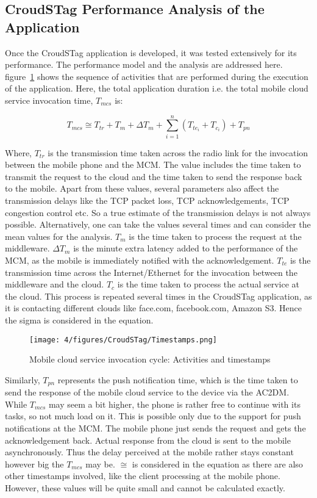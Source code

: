 \subsection{CroudSTag Performance Analysis of the Application}

Once the CroudSTag application is developed, it was tested extensively for its performance. The performance model and the analysis are addressed here. figure~\ref{fig:timestampsCroudSTag} shows the sequence of activities that are performed during the execution of the application. Here, the total application duration i.e. the total mobile cloud service invocation time, $T_{mcs}$ is:

\begin{equation}
T_{mcs} \cong  T_{tr} + T_m + \Delta T_m + \sum_{i=1}^n (T_{{te}_i} + T_{c_i}) + T_{pn}  \label{eqn:mcs:mware: times}
\end{equation}

Where, $T_{tr}$ is the transmission time taken across the radio link for the invocation between the mobile phone and the MCM. The value includes the time taken to transmit the request to the cloud and the time taken to send the response back to the mobile. Apart from these values, several parameters also affect the transmission delays like the TCP packet loss, TCP acknowledgements, TCP congestion control  etc. So a true estimate of the transmission delays is not always possible. Alternatively, one can take the values several times and can consider the mean values for the analysis. $T_m$ is the time taken to process the request at the middleware. $\Delta T_m$ is the minute extra latency added to the performance of the MCM, as the mobile is immediately notified with the acknowledgement. $T_{te}$ is the transmission time across the Internet/Ethernet for the invocation between the middleware and the cloud. $T_c$ is the time taken to process the actual service at the cloud. This process is repeated several times in the CroudSTag application, as it is contacting different clouds like face.com, facebook.com, Amazon S3. Hence the sigma is considered in the equation. 

\begin{figure}
\centering
\texttt{[image: 4/figures/CroudSTag/Timestamps.png]}
\caption{Mobile cloud service invocation cycle: Activities and timestamps}
\label{fig:timestampsCroudSTag}
\end{figure}

Similarly, $T_{pn}$ represents the push notification time, which is the time taken to send the response of the mobile cloud service to the device via the AC2DM. While $T_{mcs}$ may seem a bit higher, the phone is rather free to continue with its tasks, so not much load on it. This is possible only due to the support for push notifications at the MCM. The mobile phone just sends the request and gets the acknowledgement back. Actual response from the cloud is sent to the mobile asynchronously. Thus the delay perceived at the mobile rather stays constant however big the $T_{mcs}$ may be. $\cong$ is considered in the equation as there are also other timestamps involved, like the client processing at the mobile phone. However, these values will be quite small and cannot be calculated exactly.

